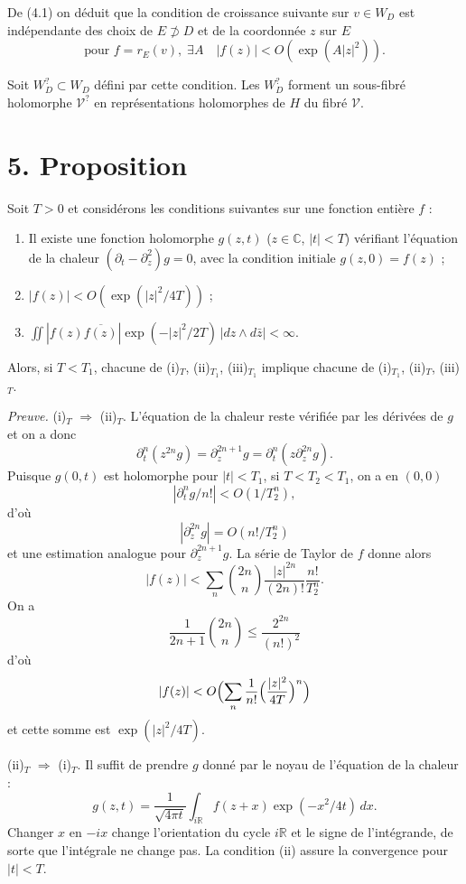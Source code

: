 \documentclass[12pt,a4paper]{article}
\theoremstyle{plain}
\theoremstyle{definition}
\theoremstyle{remark}
\begin{document}
De (4.1) on déduit que la condition de croissance suivante sur $v \in W_D$ est indépendante des choix de $E \not\supset D$ et de la coordonnée $z$ sur $E$
\begin{equation}\label{eq:4.2}
\text{pour } f = r_E(v), \; \exists A \quad |f(z)| < O(\exp(A|z|^2)).\tag{4.2}
\end{equation}

Soit $W_D^? \subset W_D$ défini par cette condition. Les $W_D^?$ forment un sous-fibré holomorphe $\mathscr{V}^?$ en représentations holomorphes de $H$ du fibré $\mathscr{V}$.

\section*{5. Proposition}

Soit $T > 0$ et considérons les conditions suivantes sur une fonction entière $f$ :

\begin{enumerate}[label=(\roman*)$_T$]
\item Il existe une fonction holomorphe $g(z, t)$ ($z \in \mathbb{C}$, $|t| < T$) vérifiant l'équation de la chaleur $(\partial_t - \partial_z^2)g = 0$, avec la condition initiale $g(z, 0) = f(z)$ ;
\item $|f(z)| < O(\exp(|z|^2/4T))$ ;
\item $\displaystyle\iint |f(z)\overline{f(z)}|\exp(-|z|^2/2T)\,|dz \wedge d\bar{z}| < \infty$.
\end{enumerate}

Alors, si $T < T_1$, chacune de (i)$_T$, (ii)$_{T_1}$, (iii)$_{T_1}$ implique chacune de (i)$_{T_1}$, (ii)$_T$, (iii)$_T$.

\medskip
\noindent\textit{Preuve.} (i)$_T$ $\Rightarrow$ (ii)$_T$. L'équation de la chaleur reste vérifiée par les dérivées de $g$ et on a donc
\[\partial_t^n(z^{2n}g) = \partial_z^{2n+1}g = \partial_t^n(z\partial_z^{2n}g).\]
Puisque $g(0, t)$ est holomorphe pour $|t| < T_1$, si $T < T_2 < T_1$, on a en $(0, 0)$
\[|\partial_t^n g/n!| < O(1/T_2^n),\]
d'où
\[|\partial_z^{2n}g| = O(n!/T_2^n)\]
et une estimation analogue pour $\partial_z^{2n+1}g$. La série de Taylor de $f$ donne alors
\[|f(z)| < \sum_n \binom{2n}{n} \frac{|z|^{2n}}{(2n)!} \frac{n!}{T_2^n}.\]
On a
\[\frac{1}{2n+1}\binom{2n}{n} \leq \frac{2^{2n}}{(n!)^2}\]
d'où
\[|f(z)| < O\Bigl(\sum_n \frac{1}{n!}\Bigl(\frac{|z|^2}{4T}\Bigr)^n\Bigr)\]
et cette somme est $\exp(|z|^2/4T)$.

(ii)$_T$ $\Rightarrow$ (i)$_T$. Il suffit de prendre $g$ donné par le noyau de l'équation de la chaleur :
\[g(z, t) = \frac{1}{\sqrt{4\pi t}}\int_{i\mathbb{R}} f(z + x)\exp(-x^2/4t)\,dx.\]
Changer $x$ en $-ix$ change l'orientation du cycle $i\mathbb{R}$ et le signe de l'intégrande, de sorte que l'intégrale ne change pas. La condition (ii) assure la convergence pour $|t| < T$.
\end{document}
